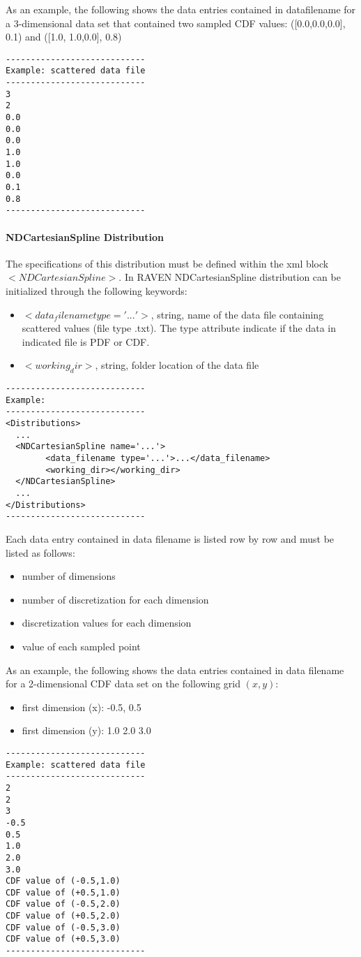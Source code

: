 As an example, the following shows the data entries contained in data\textunderscore filename for a 3-dimensional data set that contained two sampled CDF values: ([0.0,0.0,0.0], 0.1) and ([1.0, 1.0,0.0], 0.8)

\begin{lstlisting}
----------------------------
Example: scattered data file
----------------------------
3
2
0.0
0.0
0.0
1.0
1.0
0.0
0.1
0.8
----------------------------
\end{lstlisting}

\paragraph{NDCartesianSpline Distribution}
\label{NDCartesianSpline}
The specifications of this distribution must be defined within the xml block $<NDCartesianSpline>$.  In RAVEN NDCartesianSpline distribution can be initialized through the following keywords:
\begin{itemize}
\item $<data_filename   type='...' >$, string,  name of the data file containing scattered values (file type .txt). The type attribute indicate if the data in indicated file is PDF or CDF. 
\item $<working_dir>$, string, folder location of the data file
\end{itemize}

\begin{lstlisting}[style=XML]
----------------------------
Example:
----------------------------
<Distributions>
  ...
  <NDCartesianSpline name='...'>
        <data_filename type='...'>...</data_filename>
        <working_dir></working_dir>
  </NDCartesianSpline>
  ...
</Distributions>
----------------------------
\end{lstlisting}

Each data entry contained in data \textunderscore filename is listed row by row and must be listed as follows:
\begin{itemize}
\item number of dimensions
\item number of discretization for each dimension
\item discretization values for each dimension
\item value of each sampled point
\end{itemize}

As an example, the following shows the data entries contained in data \textunderscore filename for a 2-dimensional CDF data set on the following grid $(x,y)$:
\begin{itemize}
\item first dimension (x): -0.5, 0.5
\item first dimension (y): 1.0 2.0 3.0
\end{itemize}

\begin{lstlisting}
----------------------------
Example: scattered data file
----------------------------
2
2
3
-0.5
0.5
1.0 
2.0 
3.0
CDF value of (-0.5,1.0)
CDF value of (+0.5,1.0)
CDF value of (-0.5,2.0)
CDF value of (+0.5,2.0)
CDF value of (-0.5,3.0)
CDF value of (+0.5,3.0)
----------------------------
\end{lstlisting}
